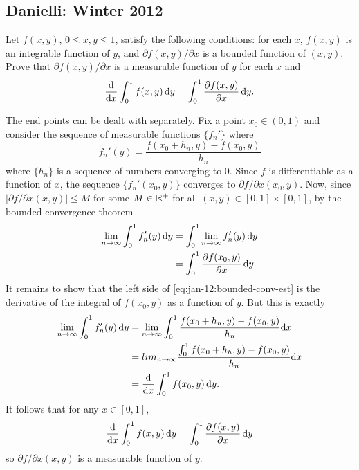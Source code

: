 \subsection{Danielli: Winter 2012}
\setcounter{exercise}{0}
\setcounter{equation}{0}

\begin{problem}
  Let \(f(x,y)\), \(0\leq x,y\leq 1\), satisfy the following conditions:
  for each \(x\), \(f(x,y)\) is an integrable function of \(y\), and
  \(\partial f(x,y)/\partial x\) is a bounded function of \((x,y)\). Prove
  that \(\partial f(x,y)/\partial x\) is a measurable function of \(y\) for
  each \(x\) and
  \[
    \frac{\mathrm{d}}{\mathrm{d} x}\int_0^1f(x,y)\mathop{}\!\mathrm{d} y= \int_0^1\frac{\partial
      f(x,y)}{\partial x}\mathop{}\!\mathrm{d} y.
  \]
\end{problem}
\begin{solution}
  The end points can be dealt with separately. Fix a point \(x_0\in(0,1)\)
  and consider the sequence of measurable functions \(\{f_n'\}\) where
  \[
    f_n'(y)=\frac{f(x_0+h_n,y)-f(x_0,y)}{h_n}
  \]
  where \(\{h_n\}\) is a sequence of numbers converging to \(0\). Since
  \(f\) is differentiable as a function of \(x\), the sequence
  \(\{f_n'(x_0,y)\}\) converges to \(\partial f/\partial x(x_0,y)\). Now,
  since \(|\partial f/\partial x(x,y)|\leq M\) for some \(M\in\mathbb{R}^+\) for
  all \((x,y)\in[0,1]\times[0,1]\), by the bounded convergence theorem
  \begin{gather}
    \label{eq:jan-12:bounded-conv-est}
    \begin{aligned}
      \lim_{n\to\infty}\int_0^1 f'_n(y)\mathop{}\!\mathrm{d} y
      &=\int_0^1\lim_{n\to\infty} f'_n(y)\mathop{}\!\mathrm{d} y\\
      &=\int_0^1 \frac{\partial f(x_0,y)}{\partial x}\mathop{}\!\mathrm{d} y.
    \end{aligned}
  \end{gather}
  It remains to show that the left side of
  \eqref{eq:jan-12:bounded-conv-est} is the derivative of the integral of
  \(f(x_0,y)\) as a function of \(y\). But this is exactly
  \begin{align*}
    \lim_{n\to\infty}\int_0^1 f'_n(y)\mathop{}\!\mathrm{d} y
    &=\lim_{n\to\infty}\int_0^1 \frac{f(x_0+h_n,y)-f(x_0,y)}{h_n}\mathrm{d} x\\
    &=lim_{n\to\infty}\frac{\int_0^1 f(x_0+h_h,y)-f(x_0,y)}{h_n}\mathrm{d} x\\
    &=\frac{\mathrm{d}}{\mathrm{d} x}\int_0^1 f(x_0,y)\mathop{}\!\mathrm{d} y.
  \end{align*}
  It follows that for any \(x\in[0,1]\),
  \[
    \frac{\mathrm{d}}{\mathrm{d} x}\int_0^1f(x,y)\mathop{}\!\mathrm{d} y= \int_0^1\frac{\partial
      f(x,y)}{\partial x}\mathop{}\!\mathrm{d} y
  \]
  so \(\partial f/\partial x(x,y)\) is a measurable function of \(y\).
\end{solution}

